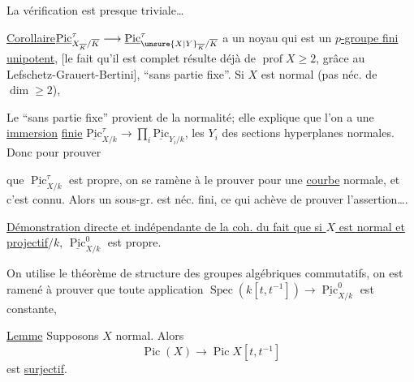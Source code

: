 La vérification est presque triviale\ldots

\uline{Corollaire}\quad $\underline{\mathrm{Pic}}^\tau_{X_{\overline{K}}/\overline{K}}\longrightarrow\underline{\mathrm{Pic}}^\tau_{\unsure{X|Y}_{\overline{K}}/\overline{K}}$ a un noyau qui est un \uline{$p$-groupe fini unipotent}, [le fait qu'il est complet résulte déjà de $\operatorname{prof}X\geq2$, grâce au  Lefschetz-Grauert-Bertini], ``sans partie fixe''. Si $X$ est normal (pas néc. de $\dim\geq2$), 

Le ``sans partie fixe'' provient de la normalité; elle explique que l'on a une \uline{immersion} \uline{finie} $\underline{\mathrm{Pic}}^\tau_{X/k}\longrightarrow\prod_i\underline{\mathrm{Pic}}_{Y_i/k}$, les $Y_i$ des sections hyperplanes  normales. Donc pour prouver

que $\underline{\operatorname{Pic}}^\tau_{X/k}$ est propre, on se ramène à le prouver pour une \uline{courbe} normale, et c'est connu. Alors un sous-gr.  est néc. fini, ce qui achève de prouver l'assertion\ldots.


\uline{Démonstration directe et indépendante de la coh. du fait que si $X$ est  normal et projectif$/k$},  $\underline{\operatorname{Pic}}^0_{X/k}$ est propre.

On utilise le théorème de structure des groupes algébriques commutatifs, on est ramené à prouver que toute application $\operatorname{Spec}(k[t,t^{-1}])\longrightarrow\underline{\operatorname{Pic}}^0_{X/k}$ est constante, 


\uline{Lemme} Supposons $X$   normal. Alors 
\[
 \operatorname{Pic}(X)\longrightarrow\operatorname{Pic}X[t,t^{-1}]
\]
est  \uline{surjectif}.


